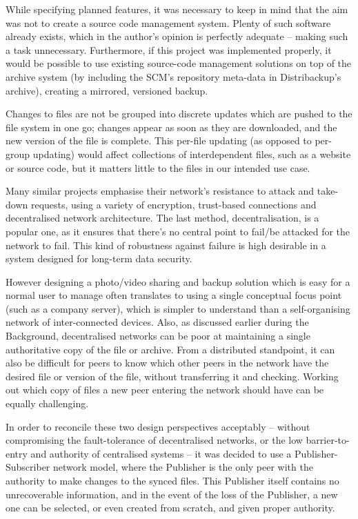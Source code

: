 \documentclass[12pt,a4paper,]{adreport}
\begin{document}
While specifying planned features, it was necessary to keep in mind that
the aim was not to create a source code management system. Plenty of
such software already exists, which in the author's opinion is perfectly
adequate -- making such a task unnecessary. Furthermore, if this project
was implemented properly, it would be possible to use existing
source-code management solutions on top of the archive system (by
including the SCM's repository meta-data in Distribackup's archive),
creating a mirrored, versioned backup.

Changes to files are not be grouped into discrete updates which are
pushed to the file system in one go; changes appear as soon as they are
downloaded, and the new version of the file is complete. This per-file
updating (as opposed to per-group updating) would affect collections of
interdependent files, such as a website or source code, but it matters
little to the files in our intended use case.

Many similar projects emphasise their network's resistance to attack and
take-down requests, using a variety of encryption, trust-based
connections and decentralised network architecture. The last method,
decentralisation, is a popular one, as it ensures that there's no
central point to fail/be attacked for the network to fail. This kind of
robustness against failure is high desirable in a system designed for
long-term data security.

However designing a photo/video sharing and backup solution which is
easy for a normal user to manage often translates to using a single
conceptual focus point (such as a company server), which is simpler to
understand than a self-organising network of inter-connected devices.
Also, as discussed earlier during the Background, decentralised networks
can be poor at maintaining a single authoritative copy of the file or
archive. From a distributed standpoint, it can also be difficult for
peers to know which other peers in the network have the desired file or
version of the file, without transferring it and checking. Working out
which copy of files a new peer entering the network should have can be
equally challenging.

In order to reconcile these two design perspectives acceptably --
without compromising the fault-tolerance of decentralised networks, or
the low barrier-to-entry and authority of centralised systems -- it was
decided to use a Publisher-Subscriber network model, where the Publisher
is the only peer with the authority to make changes to the synced files.
This Publisher itself contains no unrecoverable information, and in the
event of the loss of the Publisher, a new one can be selected, or even
created from scratch, and given proper authority.
\end{document}

